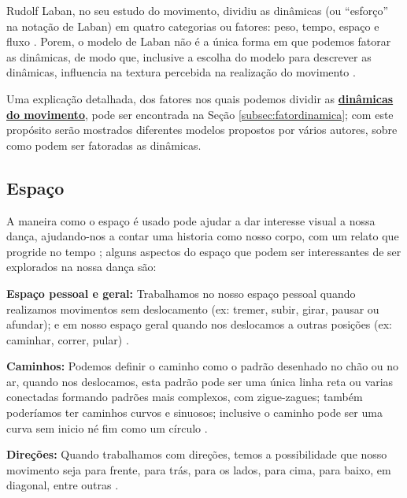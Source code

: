 Rudolf Laban, no seu estudo do movimento, 
dividiu as dinâmicas (ou ``esforço'' na notação de Laban) 
em quatro categorias ou fatores: peso, tempo, espaço e fluxo 
\cite[pp. 5]{carline2011lesson}
\cite[pp. 30]{paine2014complete}.
Porem, o modelo de Laban não é a única forma em que podemos fatorar as dinâmicas,
de modo que, inclusive a escolha do modelo para descrever as dinâmicas,
influencia na textura percebida na realização do movimento \cite[pp. 30]{paine2014complete}. 

Uma explicação detalhada, dos fatores nos quais podemos dividir as 
\hyperref[subsec:fatordinamica]{\textbf{dinâmicas do movimento}},
pode ser encontrada na Seção \ref{subsec:fatordinamica};
com este propósito serão mostrados diferentes modelos propostos por vários autores,
sobre como podem ser fatoradas as dinâmicas.



\subsection{Espaço} 
A maneira como o espaço é usado pode ajudar a dar interesse visual a nossa dança,
ajudando-nos a contar uma historia como nosso corpo, com um relato que progride no tempo 
\cite[pp. 6]{carline2011lesson}
\cite[pp. 31]{paine2014complete}
\cite[pp. 131, 136]{mccutchen2006teaching}; 
alguns aspectos do espaço que podem ser interessantes de ser explorados na nossa dança são:

\textbf{Espaço pessoal e geral:}  Trabalhamos no nosso espaço pessoal 
quando realizamos movimentos sem deslocamento 
(ex: tremer, subir, girar, pausar ou afundar);
e em nosso espaço geral quando nos deslocamos a outras posições
(ex: caminhar, correr, pular) \cite[pp. 7]{carline2011lesson}
\cite[pp. 32]{paine2014complete}.

\textbf{Caminhos:} Podemos definir o caminho como o padrão desenhado no chão ou no ar, 
quando nos deslocamos,
esta padrão pode ser uma única linha reta ou 
varias conectadas formando padrões mais complexos, 
 com zigue-zagues; também poderíamos ter caminhos curvos e sinuosos; 
inclusive o caminho pode ser uma curva sem inicio né fim como um círculo 
\cite[pp. 7]{carline2011lesson}
\cite[pp. 32]{paine2014complete}.



\textbf{Direções:} Quando trabalhamos com direções, 
temos a possibilidade que nosso movimento seja 
para frente, para trás, para os lados, para cima, para baixo, em diagonal,
entre outras 
\cite[pp. 7]{carline2011lesson}
\cite[pp. 32]{paine2014complete}
\cite[pp. 97-98]{schrader2005sense}. 


